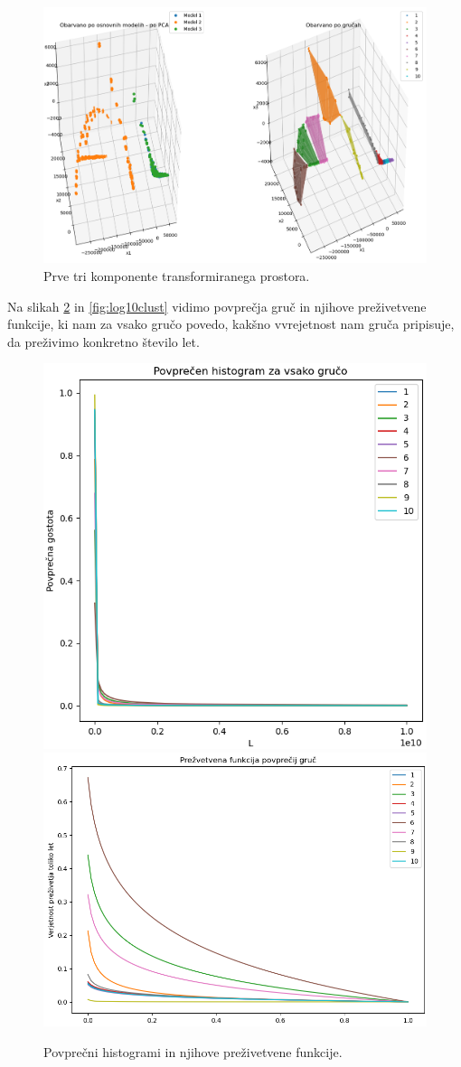 \documentclass[a4paper]{IEEEtran}
\begin{document}
\begin{figure}
	\centering
	\includegraphics[width=0.9\linewidth]{Figures/lin10pca}
	\caption{Prve tri komponente transformiranega prostora.}
	\label{fig:lin10pca}
\end{figure}

Na slikah \ref{fig:lin10clust} in \ref{fig:log10clust} vidimo povprečja gruč in njihove preživetvene funkcije, ki nam za vsako gručo povedo, kakšno vvrejetnost nam gruča pripisuje, da preživimo konkretno število let.

\begin{figure}
	\centering
	\includegraphics[width=0.49\linewidth]{Figures/lin10mean} \includegraphics[width=0.49\linewidth]{Figures/lin10surv}
	\caption{Povprečni histogrami in njihove preživetvene funkcije.}
	\label{fig:lin10clust}
\end{figure}
\end{document}
